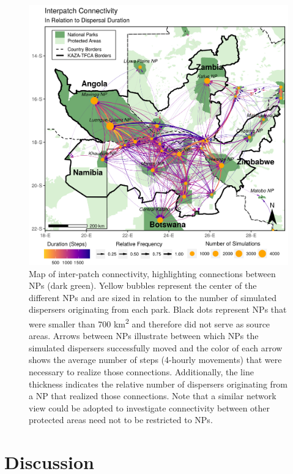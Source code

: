 \documentclass[abstract=on,10pt,a4paper,bibliography=totocnumbered]{article}
\begin{document}
\begin{figure}
  \includegraphics[width=\textwidth]{99_InterpatchConnectivity.png}
  \caption{Map of inter-patch connectivity, highlighting connections between NPs
  (dark green). Yellow bubbles represent the center of the different NPs and are
  sized in relation to the number of simulated dispersers originating from each
  park. Black dots represent NPs that were smaller than 700
  km\textsuperscript{2} and therefore did not serve as source areas. Arrows
  between NPs illustrate between which NPs the simulated dispersers successfully
  moved and the color of each arrow shows the average number of steps (4-hourly
  movements) that were necessary to realize those connections. Additionally, the
  line thickness indicates the relative number of dispersers originating from a
  NP that realized those connections. Note that a similar network view could be
  adopted to investigate connectivity between other protected areas need not to
  be restricted to NPs.}
  \label{InterpatchConnectivity}
\end{figure}

\section{Discussion}

\end{document}

